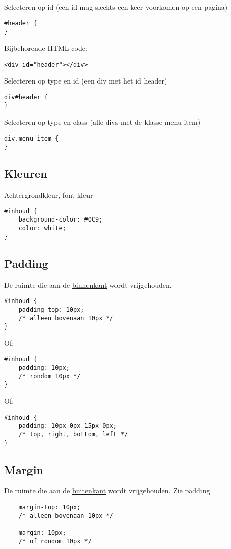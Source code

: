 \documentclass[8pt,pagesize,footinclude=false,headinclude=false]{scrartcl}
\begin{document}
\begin{multicols*}{4}
\noindent Selecteren op id (een id mag slechts een keer voorkomen op een pagina)
\begin{lstlisting}
#header {
}
\end{lstlisting}
\noindent Bijbehorende HTML code:
\begin{lstlisting}
<div id="header"></div>
\end{lstlisting}

\noindent Selecteren op type en id (een div met het id header)
\begin{lstlisting}
div#header {
}
\end{lstlisting}

\noindent Selecteren op type en class (alle divs met de klasse menu-item)
\begin{lstlisting}
div.menu-item {
}
\end{lstlisting}

\subsection*{Kleuren}
Achtergrondkleur, font kleur
\begin{lstlisting}
#inhoud {
	background-color: #0C9;
	color: white;
}
\end{lstlisting}

\subsection*{Padding}
De ruimte die aan de \underline{binnenkant} wordt vrijgehouden.
\begin{lstlisting}
#inhoud {
	padding-top: 10px; 
	/* alleen bovenaan 10px */
}
\end{lstlisting}
\noindent Of:
\begin{lstlisting}
#inhoud {
	padding: 10px; 
	/* rondom 10px */
}
\end{lstlisting}
\noindent Of:
\begin{lstlisting}
#inhoud {
	padding: 10px 0px 15px 0px; 
	/* top, right, bottom, left */
}
\end{lstlisting}

\subsection*{Margin}
De ruimte die aan de \underline{buitenkant} wordt vrijgehouden. Zie padding.
\begin{lstlisting}
	margin-top: 10px; 
	/* alleen bovenaan 10px */
	
	margin: 10px; 
	/* of rondom 10px */
	

\end{lstlisting}
\end{multicols*}
\end{document}
